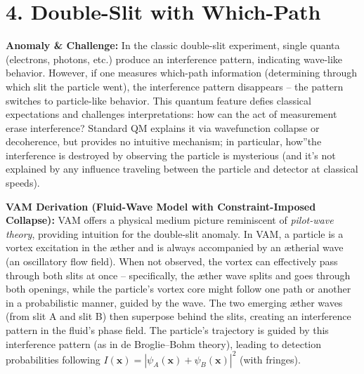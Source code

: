 \documentclass[a4paper, aps,preprint,superscriptaddress, 12pt]{revtex4}
\begin{document}
\section*{4. Double-Slit with Which-Path}

\textbf{Anomaly \& Challenge: } In the classic double-slit experiment, single quanta (electrons, photons, etc.) produce an interference pattern, indicating wave-like behavior. However, if one measures which-path information (determining through which slit the particle went), the interference pattern disappears – the pattern switches to particle-like behavior. This quantum feature defies classical expectations and challenges interpretations: how can the act of measurement erase interference? Standard QM explains it via wavefunction collapse or decoherence, but provides no intuitive mechanism; in particular, \grqq how\textquotedblright the interference is destroyed by observing the particle is mysterious (and it's not explained by any influence traveling between the particle and detector at classical speeds).


\textbf{VAM Derivation (Fluid-Wave Model with Constraint-Imposed Collapse):} VAM offers a physical medium picture reminiscent of \textit{pilot-wave theory}, providing intuition for the double-slit anomaly. In VAM, a particle is a vortex excitation in the æther and is always accompanied by an ætherial wave (an oscillatory flow field). When not observed, the vortex can effectively pass through both slits at once – specifically, the æther wave splits and goes through both openings, while the particle's vortex core might follow one path or another in a probabilistic manner, guided by the wave. The two emerging æther waves (from slit A and slit B) then superpose behind the slits, creating an interference pattern in the fluid's phase field. The particle's trajectory is guided by this interference pattern (as in de Broglie–Bohm theory), leading to detection probabilities following $I(\mathbf{x}) = |\psi_A(\mathbf{x}) + \psi_B(\mathbf{x})|^2$ (with fringes).
\end{document}
